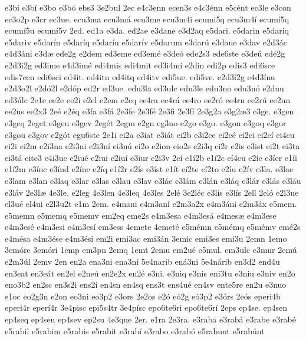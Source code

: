 {e3bi
e3b^^ed
e3bo
e3b^^f3
ebs3
3e2bul
2ec
e4c3enn
ecen3s
e4c3^^e9nn
e5c^^e9nt
ec3le
e3con
ec3o2p
e3cr
ec3ue.
ecu3ma
ecu3m^^e1
ecu3me
ecu3m4i
ecumi5q
ecu3m4^^ed
ecum^^ed5q
ecum^^ed5u
ecum^^ed5v
2ed.
ed1a
e3da.
ed2ae
e3dane
e3d2aq
e5dari.
e5darin
e5dariq
e5dariv
e5dar^^edn
e5dar^^edq
e5dar^^edu
e5dar^^edv
e5darum
e3dar^^fa
e3daue
e3dav
e2d3^^e1c
e4d3^^e1ni
e3d^^e6
ede2g
e2dem
ed3eme
ed3em^^e9
e3de^^f3
ede2s3
ede6ste
e3de^^fa
ed^^e92g
e2d3i2g
ed3ime
e4d3im^^e9
edi4mis
edi4mit
ed3i4m^^ed
e2din
edi2p
edis3
edi6sce
edis7cen
edi6sci
ed4it.
ed4itn
ed4itq
ed4itv
edi5ue.
edi5ve.
e2d3^^ed2g
e4d3^^ednu
e2d3o2l
e2d^^f32l
e2d^^f3p
ed2r
ed3ue.
edu3la
ed3ulc
edu3le
edu3no
edu3n^^f3
e2duu
ed3^^falc
2e1e
ee2e
ee2i
e2el
e2em
e2eq
ee4ra
ee4r^^e1
ee4ro
ee2r^^f3
ee4ru
ee2r^^fa
ee2un
ee2us
ee2x3
2e^^e9
e2^^e9q
e3fa
e3f^^e1
2e3fe
2e3f^^e9
2e3fi
2e3f^^ed
2e3g2a
e3g2^^e63
e3ge.
e3gen
e3geq
2eget
e3geu
e3gev
2eg^^e9t
2egm
e2gn
eg3no
e2go
e3go.
e3gon
e3goq
e3gor
e3gou
e3gov
e2g^^f3t
egu6ste
2e1i
ei2a
e3iat
e3i^^e1t
ei2b
e3i2ce
ei2c^^e9
ei2ci
ei2c^^ed
ei4cu
ei2i
ei2m
e2i3na
e2i3ni
e2i3n^^ed
ei3n^^fa
ei2o
e2ion
eio2s
e2i3q
ei2r
e2is
e3ist
ei2t
ei3ta
ei3t^^e1
eite3
e4i3ue
e2iu^^e9
e2iui
e2iu^^ed
e3iur
e2i3v
2e^^ed
e1^^ed2b
e1^^ed2c
e^^ed4cu
e2^^ede
e3^^eder
e1^^edi
e1^^ed2m
e3^^ednc
e3^^ednd
e2^^edne
e2^^edq
e1^^ed2r
e2^^eds
e3^^edst
e1^^edt
e^^ed2te
e^^ed2to
e2^^edu
e2^^edv
e3la.
e3lae
e3lam
e3lan
e3laq
e3lar
e3las
e3lau
e3lav
e3l^^e1e
e3l^^e1m
e3l^^e1n
e3l^^e1q
e3l^^e1r
e3l^^e1s
e3l^^e1u
e3l^^e1v
2e3l^^e6
4e3le.
e2leg
4e3len
4e3leq
4e3les
2el^^e9
3e2l^^e9c
e3lis
e3l^^eds
2ell
2el^^f3
e2l3ue
el3u^^e9
el4ui
e2l3u2t
e1m
2em.
e4mani
e4m3an^^ed
e2m3a2x
e4m3^^e1ni
e2m3^^e1x
e5mem.
e5memn
e5memq
e5memv
em2eq
eme2s
e4m3esa
e4m3es^^e1
e4mes^^e6
e4m3ese
e4m3es^^e9
e4m3esi
e4m3es^^ed
em3ess
4emete
4emet^^e9
e5m^^e9mn
e5m^^e9mq
e5m^^e9mv
em^^e92s
e4m^^e9sa
e4m3^^e9se
e4m3^^e9si
em2i
emi3ac
emi3^^e1n
3emic
emi3es
emi3u
2emn
1emo
3em^^f3re
3em^^f3ri
1emp
em3pn
2emq
1emt
2emu
em2u^^e9
e5mul.
em3ulc
e3mur
2em^^fa
e2m3^^fal
2emv
2en
en2a
ena3ni
ena3n^^ed
5e4narib
en^^e13ni
5e4n^^e1rib
en3d2
end4u
en3eat
en3e^^e1t
en2el
e2ne^^fa
en2e2x
en2^^e9
e3ni.
e3niq
e3nis
eni3tu
e3niu
e3niv
en2o
eno3b2
en2sc
en3s2i
ens2^^ed
en4sn
en4sq
ens3t
ens4u^^e9
en4sv
ente5re
en2u
e3nuo
e1oc
eo2g3n
e2on
eo3ni
eo3p2
e3ors
2e2os
e2^^f3
e^^f32g
e^^f33p2
e3^^f3rs
2e^^f3s
eperi4b
eperi4r
eper^^ed4r
3e4pisc
epi5s4tr
3e4p^^edsc
epo6te6ri
epo6te6r^^ed
2eps
ep4se.
ep4sen
ep4seq
ep4seu
ep4sev
ep2su
4e3que
2er.
e1ra
2e3ra.
e3raba
e3rab^^e1
e3rabe
e3rab^^e9
e5rabil
e5rabim
e5rabis
e5rabit
e3rab^^ed
e3rabo
e3rab^^f3
e5rabunt
e5rab^^fant
}
